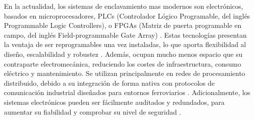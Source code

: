     En la actualidad, los sistemas de enclavamiento mas modernos son electrónicos, basados en microprocesadores, PLCs (Controlador Lógico Programable, del inglés Programmable Logic Controllers), o FPGAs (Matriz de puerta programable en campo, del inglés Field-programmable Gate Array) \cite{Paper_8,Paper_22,Paper_24,Paper_25,Paper_28,Paper_31,Paper_34,Paper_35,Paper_36}. Estas tecnologías presentan la ventaja de ser reprogramables una vez instaladas, lo que aporta flexibilidad al diseño, escalabilidad y robustez \cite{Paper_38,Paper_46,Paper_47,Paper_118,Paper_124,Paper_128,Paper_130,Paper_131,Paper_133,Paper_135,Paper_204}. Además, ocupan mucho menos espacio que su contraparte electromecánica, reduciendo los costes de infraestructura, consumo eléctrico y mantenimiento. Se utilizan principalmente en redes de procesamiento distribuido, debido a su integración de forma nativa con protocolos de comunicación industrial diseñados para entornos ferroviarios \cite{Paper_125,Paper_37,Paper_41}. Adicionalmente, los sistemas electrónicos pueden ser fácilmente auditados y redundados, para aumentar su fiabilidad y comprobar su nivel de seguridad \cite{Paper_23,Paper_29,Paper_43,Paper_49,Paper_97,Paper_98,Paper_132,Paper_140}.